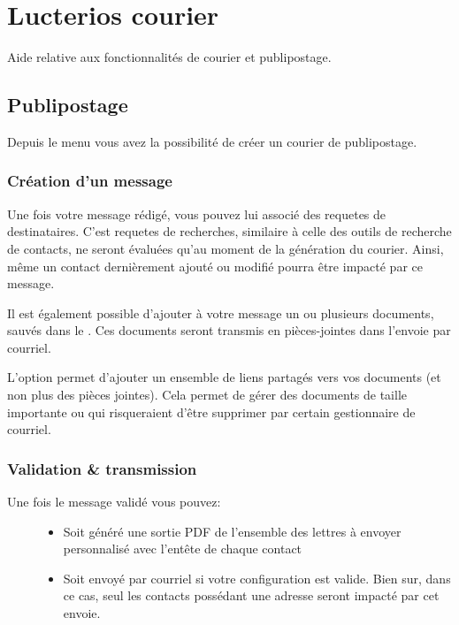 \documentclass[letterpaper,10pt,french]{sphinxmanual}
\begin{document}
\chapter{Lucterios courier}
\label{\detokenize{mailing/index:lucterios-courier}}\label{\detokenize{mailing/index::doc}}
Aide relative aux fonctionnalités de courier et publipostage.


\section{Publipostage}
\label{\detokenize{mailing/mailing:publipostage}}\label{\detokenize{mailing/mailing::doc}}
Depuis le menu  vous avez la possibilité de créer un courier de publipostage.


\subsection{Création d’un message}
\label{\detokenize{mailing/mailing:creation-d-un-message}}
Une fois votre message rédigé, vous pouvez lui associé des requetes de destinataires.
C’est requetes de recherches, similaire à celle des outils de recherche de contacts, ne seront évaluées qu’au moment de la génération du courier.
Ainsi, même un contact dernièrement ajouté ou modifié pourra être impacté par ce message.

Il est également possible d’ajouter à votre message un ou plusieurs documents, sauvés dans le .
Ces documents seront transmis en pièces-jointes dans l’envoie par courriel.

L’option  permet d’ajouter un ensemble de liens partagés vers vos documents (et non plus des pièces jointes).
Cela permet de gérer des documents de taille importante ou qui risqueraient d’être supprimer par certain gestionnaire de courriel.

\noindent{}


\subsection{Validation \& transmission}
\label{\detokenize{mailing/mailing:validation-transmission}}\begin{description}
\item[{Une fois le message validé vous pouvez:}] \leavevmode\begin{itemize}
\item {} 
Soit généré une sortie PDF de l’ensemble des lettres à envoyer personnalisé avec l’entête de chaque contact

\item {} 
Soit envoyé par courriel si votre configuration est valide. Bien sur, dans ce cas, seul les contacts possédant une adresse seront impacté par cet envoie.

\end{itemize}

\end{description}
\end{document}
